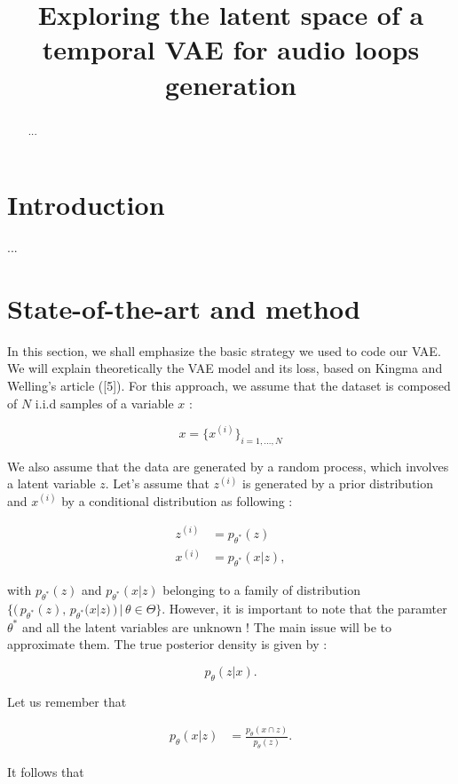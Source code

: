 \documentclass{article}
\title{Exploring the latent space of a temporal VAE for audio loops generation}
\begin{document}
\maketitle


\begin{abstract}
    ...
\end{abstract}


\section{Introduction}

...

\section{State-of-the-art and method}

In this section, we shall emphasize the basic strategy we used to code our VAE. We will explain theoretically the VAE model and its loss, based on Kingma and Welling's article ([5]). For this approach, we assume that the dataset is composed of $N$ i.i.d samples of a variable $x$ :

\begin{center}
    \[ x = \{x^{(i)}\}_{i=1,...,N}\]
\end{center}
We also assume that the data are generated by a random process, which involves a latent variable $z$. Let's assume that $z^{(i)}$ is generated by a prior distribution and $x^{(i)}$ by a conditional distribution as following :

\begin{center}
    \begin{align*}
        z^{(i)} &= p_{\theta^{*}}(z) \\
        x^{(i)} &= p_{\theta^{*}}(x | z),
    \end{align*}
\end{center}
with $p_{\theta^{*}}(z)$ and $p_{\theta^{*}}(x | z)$ belonging to a family of distribution $\{  ( \,p_{\theta^{*}}(z), \, p_{\theta^{*}}(x | z)\,) \,|\, \theta \in \Theta \}$. However, it is important to note that the paramter $\theta^*$ and all the latent variables are unknown ! The main issue will be to approximate them. The true posterior density is given by :
\begin{center}
    \[p_\theta(z | x).\]
\end{center}
Let us remember that
\begin{center}
    \begin{align*}
        p_\theta(x|z) &= \frac{p_\theta(x \cap z)}{p_\theta (z)}.
    \end{align*}
\end{center}
It follows that 
\end{document}
